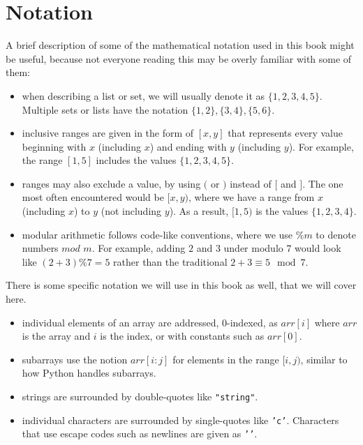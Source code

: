 \section*{Notation}

A brief description of some of the mathematical notation used in this book might be useful, because not everyone reading this may be overly familiar with some of them:
\begin{itemize}
\item when describing a list or set, we will usually denote it as $\{1,2,3,4,5\}$. Multiple sets or lists have the notation $\{1,2\},\{3,4\},\{5,6\}$.
\item inclusive ranges are given in the form of $[x,y]$ that represents every value beginning with $x$ (including $x$) and ending with $y$ (including $y$). For example, the range $[1,5]$ includes the values $\{1,2,3,4,5\}$.
\item ranges may also exclude a value, by using $($ or $)$ instead of $[$ and $]$. The one most often encountered would be $[x,y)$, where we have a range from $x$ (including $x$) to $y$ (not including $y$). As a result, $[1,5)$ is the values $\{1,2,3,4\}$.
\item modular arithmetic follows code-like conventions, where we use $\%m$ to denote numbers $mod$ $m$. For example, adding $2$ and $3$ under modulo $7$ would look like $(2 + 3) \% 7 = 5$ rather than the traditional $2+3 \equiv 5 \mod{7}$.
\end{itemize}

There is some specific notation we will use in this book as well, that we will cover here.
\begin{itemize}
\item individual elements of an array are addressed, 0-indexed, as $arr[i]$ where $arr$ is the array and $i$ is the index, or with constants such as $arr[0]$.
\item subarrays use the notion $arr[i:j]$ for elements in the range $[i,j)$, similar to how Python handles subarrays.
\item strings are surrounded by double-quotes like \texttt{"string"}.
\item individual characters are surrounded by single-quotes like \texttt{'c'}. Characters that use escape codes such as newlines are given as \texttt{'\n'}.
\end{itemize}
